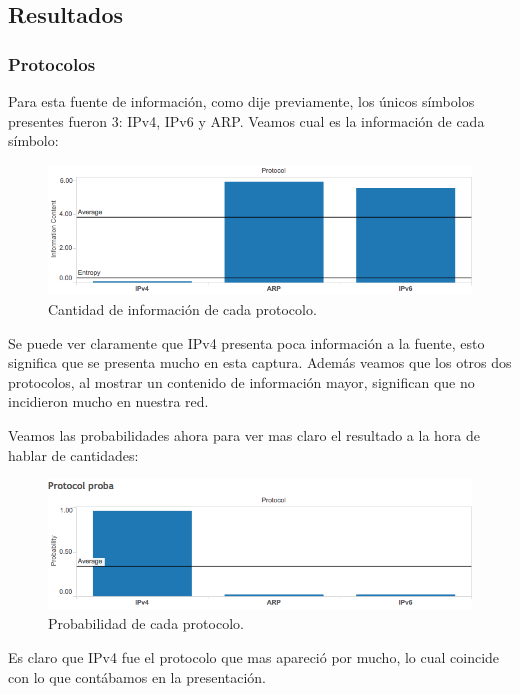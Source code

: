 \documentclass{article}
\theoremstyle{definition}
\theoremstyle{remark}
\begin{document}
\subsection{Resultados}
\subsubsection{Protocolos}
Para esta fuente de información, como dije previamente, los únicos símbolos presentes fueron 3: IPv4, IPv6 y ARP. Veamos cual es la información de cada símbolo:

\begin{figure}[H]
\centering
\includegraphics[width=420pt]{captures/MercadoLibre/Protocol PDF Dashboard.png}
\caption{Cantidad de información de cada protocolo.}
\end{figure}

Se puede ver claramente que IPv4 presenta poca información a la fuente, esto significa que se presenta mucho en esta captura. Además veamos que los otros dos protocolos, al mostrar un contenido de información mayor, significan que no incidieron mucho en nuestra red.

Veamos las probabilidades ahora para ver mas claro el resultado a la hora de hablar de cantidades:

\begin{figure}[H]
\centering
\includegraphics[width=420pt]{captures/MercadoLibre/Protocol PDF Dashboard probability.png}
\caption{Probabilidad de cada protocolo.}
\end{figure}

Es claro que IPv4 fue el protocolo que mas apareció por mucho, lo cual coincide con lo que contábamos en la presentación. 
\end{document}
